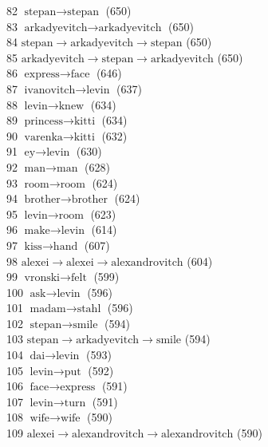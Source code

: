 \begin{appendices}
    82  $ \text{stepan} \to \text{stepan} $ (650) \\
    83  $ \text{arkadyevitch} \to \text{arkadyevitch} $ (650) \\
    84  $ \text{stepan} \to \text{arkadyevitch} \to \text{stepan} $ (650) \\
    85  $ \text{arkadyevitch} \to \text{stepan} \to \text{arkadyevitch} $ (650) \\
    86  $ \text{express} \to \text{face} $ (646) \\
    87  $ \text{ivanovitch} \to \text{levin} $ (637) \\
    88  $ \text{levin} \to \text{knew} $ (634) \\
    89  $ \text{princess} \to \text{kitti} $ (634) \\
    90  $ \text{varenka} \to \text{kitti} $ (632) \\
    91  $ \text{ey} \to \text{levin} $ (630) \\
    92  $ \text{man} \to \text{man} $ (628) \\
    93  $ \text{room} \to \text{room} $ (624) \\
    94  $ \text{brother} \to \text{brother} $ (624) \\
    95  $ \text{levin} \to \text{room} $ (623) \\
    96  $ \text{make} \to \text{levin} $ (614) \\
    97  $ \text{kiss} \to \text{hand} $ (607) \\
    98  $ \text{alexei} \to \text{alexei} \to \text{alexandrovitch} $ (604) \\
    99  $ \text{vronski} \to \text{felt} $ (599) \\
   100  $ \text{ask} \to \text{levin} $ (596) \\
   101  $ \text{madam} \to \text{stahl} $ (596) \\
   102  $ \text{stepan} \to \text{smile} $ (594) \\
   103  $ \text{stepan} \to \text{arkadyevitch} \to \text{smile} $ (594) \\
   104  $ \text{dai} \to \text{levin} $ (593) \\
   105  $ \text{levin} \to \text{put} $ (592) \\
   106  $ \text{face} \to \text{express} $ (591) \\
   107  $ \text{levin} \to \text{turn} $ (591) \\
   108  $ \text{wife} \to \text{wife} $ (590) \\
   109  $ \text{alexei} \to \text{alexandrovitch} \to \text{alexandrovitch} $ (590) \\

\end{appendices}
